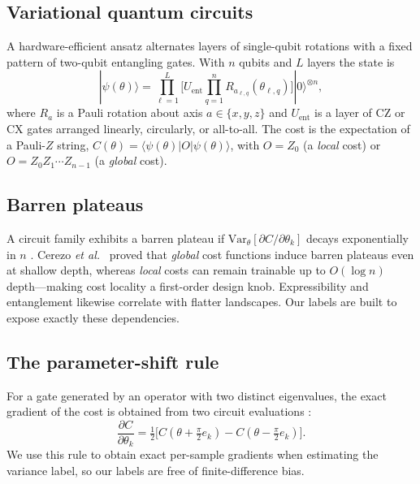 \documentclass[journal]{IEEEtran}
\begin{document}
\subsection{Variational quantum circuits}
A hardware-efficient ansatz \cite{kandala2017hardware} alternates layers of
single-qubit rotations with a fixed pattern of two-qubit entangling gates. With
$n$ qubits and $L$ layers the state is
\begin{equation}
|\psi(\theta)\rangle = \prod_{\ell=1}^{L}
  \Big[ U_{\mathrm{ent}} \prod_{q=1}^{n} R_{a_{\ell,q}}(\theta_{\ell,q}) \Big] |0\rangle^{\otimes n},
\end{equation}
where $R_a$ is a Pauli rotation about axis $a\in\{x,y,z\}$ and $U_{\mathrm{ent}}$
is a layer of CZ or CX gates arranged linearly, circularly, or all-to-all. The
cost is the expectation of a Pauli-$Z$ string,
$C(\theta)=\langle\psi(\theta)|O|\psi(\theta)\rangle$, with $O=Z_0$ (a
\emph{local} cost) or $O=Z_0Z_1\cdots Z_{n-1}$ (a \emph{global} cost).

\subsection{Barren plateaus}
A circuit family exhibits a barren plateau if
$\mathrm{Var}_\theta[\partial C/\partial\theta_k]$ decays exponentially in $n$
\cite{mcclean2018barren}. Cerezo \emph{et al.}\ \cite{cerezo2021cost} proved that
\emph{global} cost functions induce barren plateaus even at shallow depth, whereas
\emph{local} costs can remain trainable up to $O(\log n)$ depth---making cost
locality a first-order design knob. Expressibility \cite{holmes2022expressibility}
and entanglement likewise correlate with flatter landscapes. Our labels are built
to expose exactly these dependencies.

\subsection{The parameter-shift rule}
For a gate generated by an operator with two distinct eigenvalues, the exact
gradient of the cost is obtained from two circuit evaluations
\cite{mitarai2018circuit,schuld2019param}:
\begin{equation}
\frac{\partial C}{\partial\theta_k}
  = \tfrac{1}{2}\big[C(\theta + \tfrac{\pi}{2}e_k) - C(\theta - \tfrac{\pi}{2}e_k)\big].
\end{equation}
We use this rule to obtain exact per-sample gradients when estimating the
variance label, so our labels are free of finite-difference bias.
\end{document}
